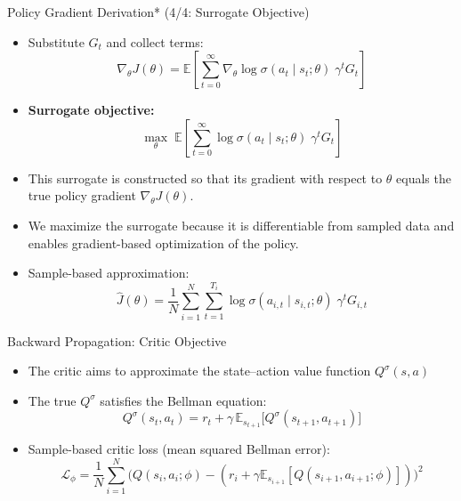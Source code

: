 \documentclass[aspectratio=169]{beamer}
\newcommand{\1}{\mathbf{1}}
\begin{document}
    
\begin{frame}{Policy Gradient Derivation* (4/4: Surrogate Objective)}
    \small
    \begin{itemize}
        \item Substitute $G_t$ and collect terms:
        \[
            \nabla_\theta J(\theta)
            =
            \mathbb{E}
            \left[
                \sum_{t=0}^{\infty}
                \nabla_\theta \log \sigma(a_t \mid s_t;\theta)\;
                \gamma^t G_t
            \right]
        \]
        \item \textbf{Surrogate objective:}
        \[
            \max_\theta\;
            \mathbb{E}
            \left[
                \sum_{t=0}^{\infty}
                \log \sigma(a_t \mid s_t;\theta)\;
                \gamma^t G_t
            \right]
        \]
        \item This surrogate is constructed so that its gradient with respect to $\theta$ equals the true policy gradient $\nabla_\theta J(\theta)$.
        \item We maximize the surrogate because it is differentiable from sampled data and enables gradient-based optimization of the policy.
        \item Sample-based approximation:
        \[
            \widehat{J}(\theta)
            =
            \frac{1}{N}
            \sum_{i=1}^{N}
            \sum_{t=1}^{T_i}
            \log \sigma(a_{i,t} \mid s_{i,t};\theta)\;
            \gamma^t G_{i,t}
        \]
    \end{itemize}
\end{frame}




\begin{frame}{Backward Propagation: Critic Objective}
    \small
    \begin{itemize}
        \item The critic aims to approximate the state--action value function $Q^\sigma(s,a)$
    
        \item The true $Q^\sigma$ satisfies the Bellman equation:
        \[
            Q^\sigma(s_t,a_t)
            =
            r_t + \gamma \, \mathbb{E}_{s_{t+1}}
            \big[ Q^\sigma(s_{t+1}, a_{t+1}) \big]
        \]
        \item Sample-based critic loss (mean squared Bellman error):
        \[
            \mathcal{L}_\phi
            =
            \frac{1}{N}
            \sum_{i=1}^{N}
            \big( Q(s_i,a_i;\phi) - (r_i + \gamma \mathbb{E}_{s_{i+1}} [Q(s_{i+1}, a_{i+1};\phi)]) \big)^2
        \]
    \end{itemize}
\end{frame}
\end{document}
